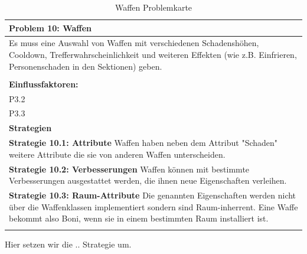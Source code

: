 \documentclass[fontsize=12pt,paper=a4,twoside]{scrartcl}
\begin{document}
\begin{table}[H]
    \centering
    \begin{tabular}{|p{15cm}|}
    \hline
          \textbf{Problem 10: Waffen}  \\ \hline
	Es muss eine Auswahl von Waffen mit verschiedenen Schadenshöhen, Cooldown, Trefferwahrscheinlichkeit und weiteren Effekten (wie z.B. Einfrieren, Personenschaden in den Sektionen) geben. \\
         \\ \hline
          \textbf{Einflussfaktoren: } \\
	P3.2 \\
	P3.3 \\
          \hline
          \textbf{Strategien} \\ \hline
            {}          
           \label{strategie:10.1}     
          \textbf{Strategie 10.1: Attribute} Waffen haben neben dem Attribut "Schaden" weitere Attribute die sie von anderen Waffen unterscheiden.  \\        
  {}          
           \label{strategie:10.2}              
          \textbf{Strategie 10.2: Verbesserungen} Waffen können mit bestimmte Verbesserungen ausgestattet werden, die ihnen neue Eigenschaften verleihen.  \\
	 {}          
           \label{strategie:10.3}     
          \textbf{Strategie 10.3: Raum-Attribute} Die genannten Eigenschaften werden nicht über die Waffenklassen implementiert sondern sind Raum-inherrent. Eine Waffe bekommt also Boni, wenn sie in einem bestimmten Raum installiert ist.  \\ 
	 \\ \hline
    \end{tabular}

    \caption{Waffen Problemkarte}
    \label{tab:ProblemKarte10}
\end{table}
Hier setzen wir die .. Strategie um. \\
\end{document}
